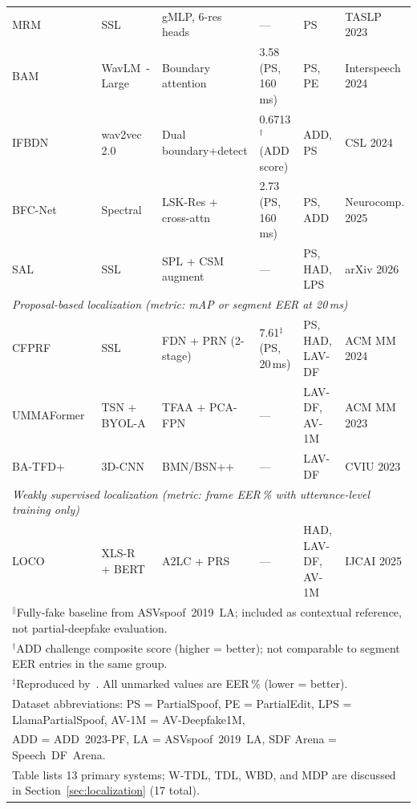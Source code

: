 \documentclass[journal]{IEEEtran}
\begin{document}
\begin{table}[t]
{\begin{tabular}{llllll}
\midrule
MRM~\cite{zhang2023partialspoof}   & SSL        & gMLP, 6-res heads   & ---                  & PS             & TASLP 2023 \\
BAM~\cite{zhong2024bam}            & WavLM~\cite{chen2022wavlm}-Large & Boundary attention  & 3.58 (PS, 160\,ms)  & PS, PE         & Interspeech 2024 \\
IFBDN~\cite{cai2024ifbdn}          & wav2vec 2.0~\cite{baevski2020wav2vec2} & Dual boundary+detect & 0.6713$^\dag$ (ADD score)  & ADD, PS        & CSL 2024 \\
BFC-Net~\cite{zhou2025bfcnet}      & Spectral   & LSK-Res + cross-attn & 2.73 (PS, 160\,ms)  & PS, ADD        & Neurocomp. 2025 \\
SAL~\cite{sal2026}                 & SSL        & SPL + CSM augment    & ---                 & PS, HAD, LPS   & arXiv 2026 \\
\midrule
\multicolumn{6}{l}{\textit{Proposal-based localization (metric: mAP or segment EER at 20\,ms)}} \\
\midrule
CFPRF~\cite{wu2024cfprf}           & SSL        & FDN + PRN (2-stage)  & 7.61$^\ddagger$ (PS, 20\,ms)  & PS, HAD, LAV-DF & ACM MM 2024 \\
UMMAFormer~\cite{zhang2023ummaformer} & TSN + BYOL-A & TFAA + PCA-FPN  & ---                 & LAV-DF, AV-1M  & ACM MM 2023 \\
BA-TFD+~\cite{cai2023lavdf_cviu}   & 3D-CNN     & BMN/BSN++            & ---                 & LAV-DF         & CVIU 2023 \\
\midrule
\multicolumn{6}{l}{\textit{Weakly supervised localization (metric: frame EER\,\% with utterance-level training only)}} \\
\midrule
LOCO~\cite{10.24963/ijcai.2025/65}             & XLS-R~\cite{babu2022xlsr} + BERT & A2LC + PRS         & ---                 & HAD, LAV-DF, AV-1M & IJCAI 2025 \\
\bottomrule
\multicolumn{6}{l}{\footnotesize $^\parallel$Fully-fake baseline from ASVspoof~2019~LA; included as contextual reference, not partial-deepfake evaluation.} \\
\multicolumn{6}{l}{\footnotesize $^\dag$ADD challenge composite score (higher = better); not comparable to segment EER entries in the same group.} \\
\multicolumn{6}{l}{\footnotesize $^\ddagger$Reproduced by~\cite{luong2025metrics}. All unmarked values are EER\,\% (lower = better).} \\
\multicolumn{6}{l}{\footnotesize Dataset abbreviations: PS = PartialSpoof, PE = PartialEdit, LPS = LlamaPartialSpoof, AV-1M = AV-Deepfake1M,} \\
\multicolumn{6}{l}{\footnotesize ADD = ADD~2023-PF, LA = ASVspoof~2019~LA, SDF Arena = Speech~DF~Arena.} \\
\multicolumn{6}{l}{\footnotesize Table lists 13 primary systems; W-TDL, TDL, WBD, and MDP are discussed in Section~\ref{sec:localization} (17 total).}
\end{tabular}%
}
\end{table}
\end{document}
